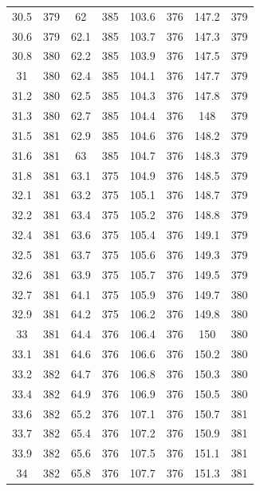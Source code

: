 \documentclass[12pt]{ctexart}
\numberwithin{equation}{section}
\begin{document}
\begin{longtable}{cc|cc|cc|cc}
30.5  &  379  &  62  &  385  &  103.6  &  376  &  147.2  &  379  \\
30.6  &  379  &  62.1  &  385  &  103.7  &  376  &  147.3  &  379  \\
30.8  &  380  &  62.2  &  385  &  103.9  &  376  &  147.5  &  379  \\
31  &  380  &  62.4  &  385  &  104.1  &  376  &  147.7  &  379  \\
31.2  &  380  &  62.5  &  385  &  104.3  &  376  &  147.8  &  379  \\
31.3  &  380  &  62.7  &  385  &  104.4  &  376  &  148  &  379  \\
31.5  &  381  &  62.9  &  385  &  104.6  &  376  &  148.2  &  379  \\
31.6  &  381  &  63  &  385  &  104.7  &  376  &  148.3  &  379  \\
31.8  &  381  &  63.1  &  375  &  104.9  &  376  &  148.5  &  379  \\
32.1  &  381  &  63.2  &  375  &  105.1  &  376  &  148.7  &  379  \\
32.2  &  381  &  63.4  &  375  &  105.2  &  376  &  148.8  &  379  \\
32.4  &  381  &  63.6  &  375  &  105.4  &  376  &  149.1  &  379  \\
32.5  &  381  &  63.7  &  375  &  105.6  &  376  &  149.3  &  379  \\
32.6  &  381  &  63.9  &  375  &  105.7  &  376  &  149.5  &  379  \\
32.7  &  381  &  64.1  &  375  &  105.9  &  376  &  149.7  &  380  \\
32.9  &  381  &  64.2  &  375  &  106.2  &  376  &  149.8  &  380  \\
33  &  381  &  64.4  &  376  &  106.4  &  376  &  150  &  380  \\
33.1  &  381  &  64.6  &  376  &  106.6  &  376  &  150.2  &  380  \\
33.2  &  382  &  64.7  &  376  &  106.8  &  376  &  150.3  &  380  \\
33.4  &  382  &  64.9  &  376  &  106.9  &  376  &  150.5  &  380  \\
33.6  &  382  &  65.2  &  376  &  107.1  &  376  &  150.7  &  381  \\
33.7  &  382  &  65.4  &  376  &  107.2  &  376  &  150.9  &  381  \\
33.9  &  382  &  65.6  &  376  &  107.5  &  376  &  151.1  &  381  \\
34  &  382  &  65.8  &  376  &  107.7  &  376  &  151.3  &  381  \\

\end{longtable}
\end{document}
